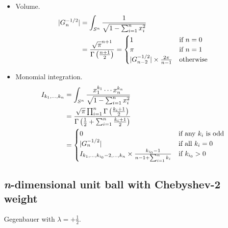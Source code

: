 \documentclass[final]{scrartcl}
\begin{document}
\begin{itemize}
  \item Volume.
    \begin{align}\nonumber
    |G_n^{-1/2}|
      &= \int_{S^n} \frac{1}{\sqrt{1 - \sum_{i=1}^n x_i^2}}\\
      &= \frac{%
        \sqrt{\pi}^{n+1}
      }{%
        \Gamma\left(\frac{n+1}{2}\right)
      }
      =\begin{cases}
        1&\text{if $n=0$}\\
        \pi&\text{if $n=1$}\\
        |G_{n-2}^{-1/2}| \times \frac{2\pi}{n-1}&\text{otherwise}
      \end{cases}
    \end{align}

  \item Monomial integration.
    \begin{align}\nonumber
    I_{k_1,\dots,k_n}
      &= \int_{S^n} \frac{x_1^{k_1}\cdots x_n^{k_n}}{\sqrt{1 - \sum_{i=1}^n x_i^2}}\\
      &= \frac{%
        \sqrt{\pi} \prod_{i=1}^n \Gamma\left(\frac{k_i+1}{2}\right)
      }{%
        \Gamma\left(\frac{1}{2} + \sum_{i=1}^n \frac{k_i+1}{2}\right)
      }\\
      &= \begin{cases}
        0&\text{if any $k_i$ is odd}\\
        |G_n^{-1/2}|&\text{if all $k_i=0$}\\
        I_{k_1,\dots,k_{i_0}-2,\dots,k_n} \times \frac{k_{i_0}-1}{n-1 + \sum_{i=1}^n k_i}&\text{if $k_{i_0} > 0$}
      \end{cases}
    \end{align}
\end{itemize}


\subsection*{\textit{n}-dimensional unit ball with Chebyshev-2 weight}
Gegenbauer with $\lambda = +\frac{1}{2}$.
\end{document}

